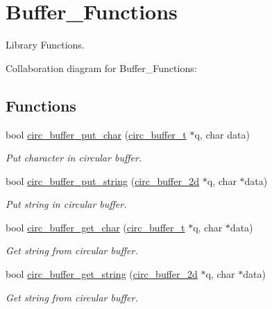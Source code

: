 \hypertarget{group___buffer___functions}{}\section{Buffer\+\_\+\+Functions}
\label{group___buffer___functions}


Library Functions.  


Collaboration diagram for Buffer\+\_\+\+Functions\+:
\subsection*{Functions}
\begin{DoxyCompactItemize}
\item 
bool \hyperlink{group___buffer___functions_ga334ce70427261ea1df018dde9889a679}{circ\+\_\+buffer\+\_\+put\+\_\+char} (\hyperlink{structcirc__buffer__t}{circ\+\_\+buffer\+\_\+t} $\ast$q, char data)
\begin{DoxyCompactList}\small\item\em Put character in circular buffer. \end{DoxyCompactList}\item 
bool \hyperlink{group___buffer___functions_ga34a47ceaa3cf27b3da4120450ec0d9d8}{circ\+\_\+buffer\+\_\+put\+\_\+string} (\hyperlink{structcirc__buffer__2d}{circ\+\_\+buffer\+\_\+2d} $\ast$q, char $\ast$data)
\begin{DoxyCompactList}\small\item\em Put string in circular buffer. \end{DoxyCompactList}\item 
bool \hyperlink{group___buffer___functions_ga28f5578f75c7960a29b69026b32b6c49}{circ\+\_\+buffer\+\_\+get\+\_\+char} (\hyperlink{structcirc__buffer__t}{circ\+\_\+buffer\+\_\+t} $\ast$q, char $\ast$data)
\begin{DoxyCompactList}\small\item\em Get string from circular buffer. \end{DoxyCompactList}\item 
bool \hyperlink{group___buffer___functions_gad2d60d48e2479f41e8d4e6eedba774a1}{circ\+\_\+buffer\+\_\+get\+\_\+string} (\hyperlink{structcirc__buffer__2d}{circ\+\_\+buffer\+\_\+2d} $\ast$q, char $\ast$data)
\begin{DoxyCompactList}\small\item\em Get string from circular buffer. \end{DoxyCompactList}\item 

\end{DoxyCompactItemize}
